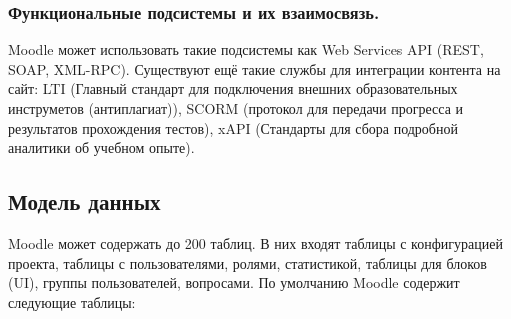 \documentclass[a4paper, 14pt]{extarticle}
\begin{document}
\subsubsection{Функциональные подсистемы и их взаимосвязь.}
Moodle может использовать такие подсистемы как Web Services API (REST, SOAP, XML-RPC). Существуют ещё такие службы для интеграции контента на сайт: LTI (Главный стандарт для подключения внешних образовательных инструметов (антиплагиат)), SCORM (протокол для передачи прогресса и результатов прохождения тестов), xAPI (Стандарты для сбора подробной аналитики об учебном опыте).
\subsection{Модель данных}
Moodle может содержать до 200 таблиц. В них входят таблицы с конфигурацией проекта, таблицы с пользователями, ролями, статистикой, таблицы для блоков (UI), группы пользователей, вопросами.
По умолчанию Moodle содержит следующие таблицы:
\end{document}
